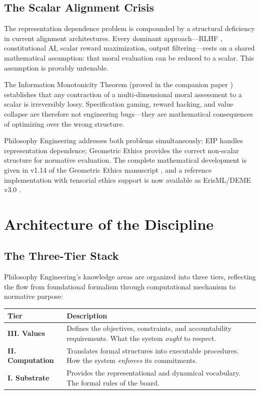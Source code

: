 \documentclass[12pt,letterpaper]{article}
\theoremstyle{definition}
\theoremstyle{plain}
\begin{document}
\subsection{The Scalar Alignment Crisis}

The representation dependence problem is compounded by a structural deficiency in current alignment architectures. Every dominant approach---RLHF \cite{christiano2017}, constitutional AI, scalar reward maximization, output filtering---rests on a shared mathematical assumption: that moral evaluation can be reduced to a scalar. This assumption is provably untenable.

The Information Monotonicity Theorem (proved in the companion paper \cite{bond2026geometric}) establishes that any contraction of a multi-dimensional moral assessment to a scalar is irreversibly lossy. Specification gaming, reward hacking, and value collapse are therefore not engineering bugs---they are mathematical consequences of optimizing over the wrong structure.

Philosophy Engineering addresses both problems simultaneously: EIP handles representation dependence; Geometric Ethics provides the correct non-scalar structure for normative evaluation. The complete mathematical development is given in v1.14 of the Geometric Ethics manuscript \cite{bond2026geometric}, and a reference implementation with tensorial ethics support is now available as ErisML/DEME v3.0 \cite{bond2026erisml}.


\section{Architecture of the Discipline}
\label{sec:architecture}

\subsection{The Three-Tier Stack}

Philosophy Engineering's knowledge areas are organized into three tiers, reflecting the flow from foundational formalism through computational mechanism to normative purpose:

\begin{center}
\renewcommand{\arraystretch}{1.4}
\begin{tabular}{>{\bfseries}p{3cm} p{9cm}}
\toprule
\textbf{Tier} & \textbf{Description} \\
\midrule
III. Values & Defines the objectives, constraints, and accountability requirements. What the system \emph{ought} to respect. \\
\addlinespace
II. Computation & Translates formal structures into executable procedures. How the system \emph{enforces} its commitments. \\
\addlinespace
I. Substrate & Provides the representational and dynamical vocabulary. The formal rules of the board. \\
\bottomrule
\end{tabular}
\end{center}
\end{document}
